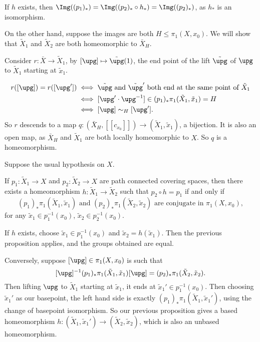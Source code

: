 \documentclass[12pt]{article}
\begin{document}
\begin{proofbox}
	If $h$ exists, then $\Img((p_1)_\ast) = \Img((p_2)_\ast \circ h_\ast) = \Img((p_2)_\ast)$, as $h_\ast$ is an isomorphism.

	On the other hand, suppose the images are both $H \leq \pi_1(X, x_0)$. We will show that $\tilde X_1$ and $\tilde X_2$ are both homeomorphic to $\bar X_H$.

	Consider $r : \bar X \to \tilde X_1$, by $[\upg] \mapsto \tilde \upg(1)$, the end point of the lift $\tilde \upg$ of $\upg$ to $\tilde X_1$ starting at $\tilde x_1$.

	\begin{align*}
	r([\upg]) = r([\upg']) &\iff \tilde \upg\text{ and } \tilde \upg' \text{ both end at the same point of } \tilde X_1 \\
			       &\iff [\upg' \cdot \upg^{-1}] \in (p_1)_\ast \pi_1(\tilde X_1, \tilde x_1) = H \\
			       &\iff [\upg] \sim_H [\upg'].
	\end{align*}
	So $r$ descends to a map $q : (\bar X_H, [[c_{x_0}]])\to (\tilde X_1, \tilde x_1)$, a bijection. It is also an open map, as $\bar X_H$ and $\tilde X_1$ are both locally homeomorphic to $X$. So $q$ is a homeomorphism.
\end{proofbox}

\begin{corollary}
	Suppose the usual hypothesis on $X$.

	If $p_1 : \tilde X_1 \to X$ and $p_2 : \tilde X_2 \to X$ are path connected covering spaces, then there exists a homeomorphism $h : \tilde X_1 \to \tilde X_2$ such that $p_2 \circ h = p_1$ if and only if
	\[
		(p_1)_\ast \pi_1(\tilde X_1, \tilde x_1) \text{ and } (p_2)_\ast \pi_1(\tilde X_2, \tilde x_2) \text{ are conjugate in } \pi_1(X, x_0),
	\]
	for any $\tilde x_1 \in p_1^{-1}(x_0)$, $\tilde x_2 \in p_2^{-1}(x_0)$.
\end{corollary}

\begin{proofbox}
	If $h$ exists, choose $\tilde x_1 \in p_1^{-1}(x_0)$ and $\tilde x_2 = h(\tilde x_1)$. Then the previous proposition applies, and the groups obtained are equal.

	Conversely, suppose $[\upg] \in \pi_1(X, x_0)$ is such that
	\[
		[\upg]^{-1} (p_1)_\ast \pi_1(\tilde X_1, \tilde x_1) [\upg] = (p_2)_\ast \pi_1(\tilde X_2, \tilde x_2).
	\]
	Then lifting $\upg$ to $\tilde X_1$ starting at $\tilde x_1$, it ends at $\tilde x_1' \in p_1^{-1}(x_0)$. Then choosing $\tilde x_1'$ as our basepoint, the left hand side is exactly $(p_1)_\ast \pi_1(\tilde X_1, \tilde x_1')$, using the change of basepoint isomorphism. So our previous proposition gives a based homeomorphism $h : (\tilde X_1, \tilde x_1') \to (\tilde X_2, \tilde x_2)$, which is also an unbased homeomorphism.
\end{proofbox}
\end{document}
